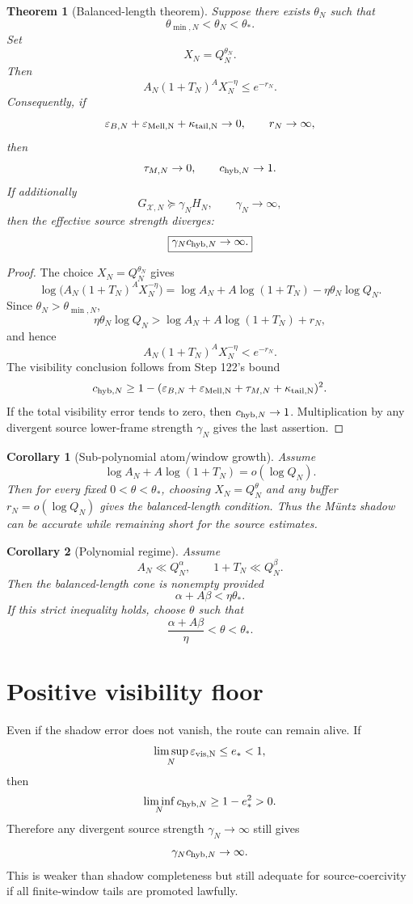 \documentclass[11pt]{article}
\newtheorem{theorem}{Theorem}
\newtheorem{corollary}{Corollary}
\newcommand{\eps}{\varepsilon}
\newcommand{\cX}{\mathcal X}
\begin{document}
\begin{theorem}[Balanced-length theorem]
Suppose there exists $\theta_N$ such that
\[
\theta_{\min,N}<\theta_N<\theta_*.
\]
Set
\[
X_N=Q_N^{\theta_N}.
\]
Then
\[
A_N(1+T_N)^A X_N^{-\eta}
\le e^{-r_N}.
\]
Consequently, if
\[
\eps_{B,N}+\eps_{\rm Mell,N}+\kappa_{\rm tail,N}\to0,
\qquad r_N\to\infty,
\]
then
\[
\tau_{M,N}\to0,
\qquad
c_{{\rm hyb},N}\to1.
\]
If additionally
\[
G_{\cX,N}\succeq\gamma_NH_N,
\qquad \gamma_N\to\infty,
\]
then the effective source strength diverges:
\[
\boxed{\gamma_Nc_{{\rm hyb},N}\to\infty.}
\]
\end{theorem}

\begin{proof}
The choice $X_N=Q_N^{\theta_N}$ gives
\[
\log\bigl(A_N(1+T_N)^A X_N^{-\eta}\bigr)
=\log A_N+A\log(1+T_N)-\eta\theta_N\log Q_N.
\]
Since $\theta_N>\theta_{\min,N}$,
\[
\eta\theta_N\log Q_N
>
\log A_N+A\log(1+T_N)+r_N,
\]
and hence
\[
A_N(1+T_N)^A X_N^{-\eta}<e^{-r_N}.
\]
The visibility conclusion follows from Step 122's bound
\[
c_{{\rm hyb},N}\ge1-(\eps_{B,N}+\eps_{\rm Mell,N}+\tau_{M,N}+\kappa_{\rm tail,N})^2.
\]
If the total visibility error tends to zero, then $c_{{\rm hyb},N}\to1$.  Multiplication by any divergent source lower-frame strength $\gamma_N$ gives the last assertion.
\end{proof}

\begin{corollary}[Sub-polynomial atom/window growth]
Assume
\[
\log A_N+A\log(1+T_N)=o(\log Q_N).
\]
Then for every fixed $0<\theta<\theta_*$, choosing $X_N=Q_N^{\theta}$ and any buffer $r_N=o(\log Q_N)$ gives the balanced-length condition.  Thus the M\"untz shadow can be accurate while remaining short for the source estimates.
\end{corollary}

\begin{corollary}[Polynomial regime]
Assume
\[
A_N\ll Q_N^{\alpha},
\qquad
1+T_N\ll Q_N^{\beta}.
\]
Then the balanced-length cone is nonempty provided
\[
\boxed{\alpha+A\beta<\eta\theta_*.}
\]
If this strict inequality holds, choose $\theta$ such that
\[
\frac{\alpha+A\beta}{\eta}<\theta<\theta_*.
\]
\end{corollary}

\section{Positive visibility floor}
Even if the shadow error does not vanish, the route can remain alive.  If
\[
\limsup_N\eps_{\rm vis,N}\le e_*<1,
\]
then
\[
\liminf_N c_{{\rm hyb},N}
\ge1-e_*^2>0.
\]
Therefore any divergent source strength $\gamma_N\to\infty$ still gives
\[
\gamma_Nc_{{\rm hyb},N}\to\infty.
\]
This is weaker than shadow completeness but still adequate for source-coercivity if all finite-window tails are promoted lawfully.
\end{document}
